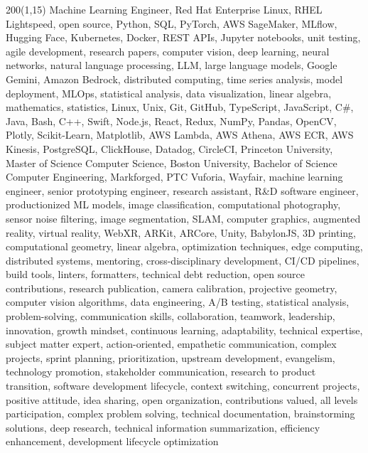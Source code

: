 \documentclass[letterpaper,10pt]{article}
\begin{document}
\begin{textblock}{200}(1,15)
    \color{white}\fontsize{1pt}{1pt}\selectfont
    Machine Learning Engineer, Red Hat Enterprise Linux, RHEL Lightspeed, open source, Python, SQL, PyTorch, AWS SageMaker, MLflow, Hugging Face, Kubernetes, Docker, REST APIs, Jupyter notebooks, unit testing, agile development, research papers, computer vision, deep learning, neural networks, natural language processing, LLM, large language models, Google Gemini, Amazon Bedrock, distributed computing, time series analysis, model deployment, MLOps, statistical analysis, data visualization, linear algebra, mathematics, statistics, Linux, Unix, Git, GitHub, TypeScript, JavaScript, C\#, Java, Bash, C++, Swift, Node.js, React, Redux, NumPy, Pandas, OpenCV, Plotly, Scikit-Learn, Matplotlib, AWS Lambda, AWS Athena, AWS ECR, AWS Kinesis, PostgreSQL, ClickHouse, Datadog, CircleCI, Princeton University, Master of Science Computer Science, Boston University, Bachelor of Science Computer Engineering, Markforged, PTC Vuforia, Wayfair, machine learning engineer, senior prototyping engineer, research assistant, R\&D software engineer, productionized ML models, image classification, computational photography, sensor noise filtering, image segmentation, SLAM, computer graphics, augmented reality, virtual reality, WebXR, ARKit, ARCore, Unity, BabylonJS, 3D printing, computational geometry, linear algebra, optimization techniques, edge computing, distributed systems, mentoring, cross-disciplinary development, CI/CD pipelines, build tools, linters, formatters, technical debt reduction, open source contributions, research publication, camera calibration, projective geometry, computer vision algorithms, data engineering, A/B testing, statistical analysis, problem-solving, communication skills, collaboration, teamwork, leadership, innovation, growth mindset, continuous learning, adaptability, technical expertise, subject matter expert, action-oriented, empathetic communication, complex projects, sprint planning, prioritization, upstream development, evangelism, technology promotion, stakeholder communication, research to product transition, software development lifecycle, context switching, concurrent projects, positive attitude, idea sharing, open organization, contributions valued, all levels participation, complex problem solving, technical documentation, brainstorming solutions, deep research, technical information summarization, efficiency enhancement, development lifecycle optimization
\end{textblock}

\end{document}
